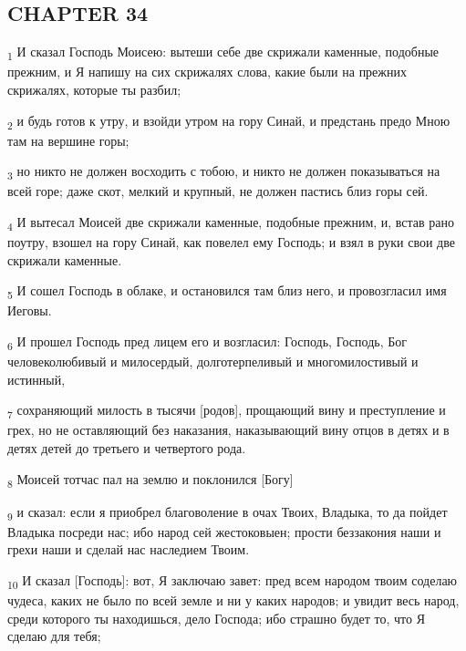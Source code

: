 \subsection{CHAPTER 34}
\begin{tcolorbox}
\textsubscript{1} И сказал Господь Моисею: вытеши себе две скрижали каменные, подобные прежним, и Я напишу на сих скрижалях слова, какие были на прежних скрижалях, которые ты разбил;
\end{tcolorbox}
\begin{tcolorbox}
\textsubscript{2} и будь готов к утру, и взойди утром на гору Синай, и предстань предо Мною там на вершине горы;
\end{tcolorbox}
\begin{tcolorbox}
\textsubscript{3} но никто не должен восходить с тобою, и никто не должен показываться на всей горе; даже скот, мелкий и крупный, не должен пастись близ горы сей.
\end{tcolorbox}
\begin{tcolorbox}
\textsubscript{4} И вытесал Моисей две скрижали каменные, подобные прежним, и, встав рано поутру, взошел на гору Синай, как повелел ему Господь; и взял в руки свои две скрижали каменные.
\end{tcolorbox}
\begin{tcolorbox}
\textsubscript{5} И сошел Господь в облаке, и остановился там близ него, и провозгласил имя Иеговы.
\end{tcolorbox}
\begin{tcolorbox}
\textsubscript{6} И прошел Господь пред лицем его и возгласил: Господь, Господь, Бог человеколюбивый и милосердый, долготерпеливый и многомилостивый и истинный,
\end{tcolorbox}
\begin{tcolorbox}
\textsubscript{7} сохраняющий милость в тысячи [родов], прощающий вину и преступление и грех, но не оставляющий без наказания, наказывающий вину отцов в детях и в детях детей до третьего и четвертого рода.
\end{tcolorbox}
\begin{tcolorbox}
\textsubscript{8} Моисей тотчас пал на землю и поклонился [Богу]
\end{tcolorbox}
\begin{tcolorbox}
\textsubscript{9} и сказал: если я приобрел благоволение в очах Твоих, Владыка, то да пойдет Владыка посреди нас; ибо народ сей жестоковыен; прости беззакония наши и грехи наши и сделай нас наследием Твоим.
\end{tcolorbox}
\begin{tcolorbox}
\textsubscript{10} И сказал [Господь]: вот, Я заключаю завет: пред всем народом твоим соделаю чудеса, каких не было по всей земле и ни у каких народов; и увидит весь народ, среди которого ты находишься, дело Господа; ибо страшно будет то, что Я сделаю для тебя;
\end{tcolorbox}
